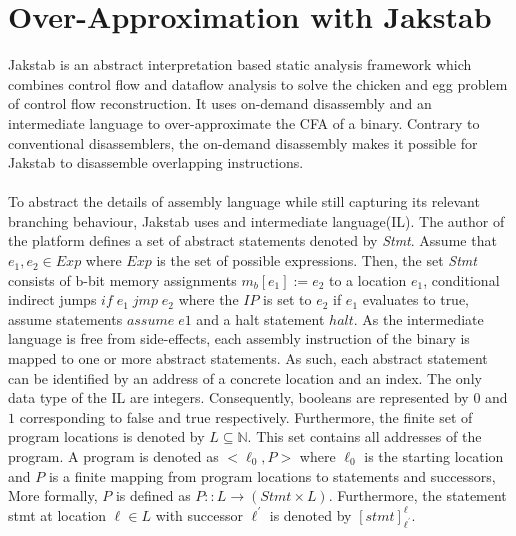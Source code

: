 \documentclass{kththesis}
\newcommand{\fbcomment}[1]{{#1}}
\renewcommand{\fbcomment}[1]{}
\renewcommand{\it}[1]{\textit{#1}}
\begin{document}
\section{Over-Approximation with Jakstab}
\fbcomment{\color{red}Goal: give the reader an overview of Jakstab and enough understanding of the notation in the PhD thesis of Jakstab(So that this can be used in later sections such for example as the section about CPA modifications). Also, introduce concepts such as tops and bottoms in the context of the Jakstab tool}
Jakstab\cite{Jakstab} is an abstract interpretation based static analysis framework which combines control flow and dataflow analysis to solve the chicken and egg problem of control flow reconstruction. It uses on-demand disassembly and an intermediate language to over-approximate the CFA of a binary. Contrary to conventional disassemblers, the on-demand disassembly makes it possible for Jakstab to disassemble overlapping instructions. 
\\ \\
To abstract the details of assembly language while still capturing its relevant branching behaviour, Jakstab uses and intermediate language(IL). The author of the platform defines a set of abstract statements denoted by \it{Stmt}. Assume that $e_1,e_2 \in Exp$ where $Exp$ is the set of possible expressions. Then, the set \it{Stmt} consists of b-bit memory assignments $m_b[e_1] := e_2$ to a location $e_1$, conditional indirect jumps $if\;e_1\;jmp\;e_2$ where the $IP$ is set to $e_2$ if $e_1$ evaluates to true, assume statements $assume\;e1$ and a halt statement $halt$. As the intermediate language is free from side-effects, each assembly instruction of the binary is mapped to one or more abstract statements. As such, each abstract statement can be identified by an address of a concrete location and an index. 
\clearpage
\noindent
The only data type of the IL are integers. Consequently, booleans are represented by $0$ and $1$ corresponding to false and true respectively. Furthermore, the finite set of program locations is denoted by $L \subseteq \mathbb{N}$. This set contains all addresses of the program. A program is denoted as $<\ell_0,P>$ where $\ell_0$ is the starting location and $P$ is a finite mapping from program locations to statements and successors, More formally, $P$ is defined as $P:: L \rightarrow (Stmt \times L)$. Furthermore, the statement stmt at location $\ell \in L$ with successor $\ell^{'}$ is denoted by $[stmt]^{\ell}_{\ell^{'}}$. 
\\ \\
\end{document}
